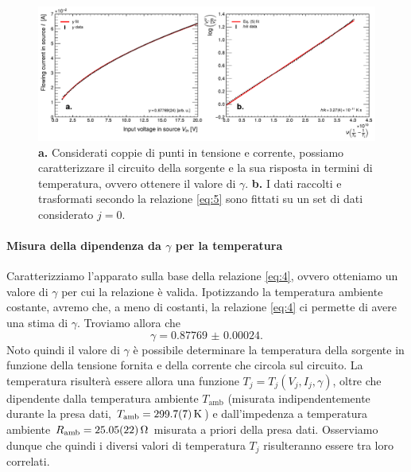 \documentclass[a4paper, varvw, nofootinbib]{revtex4-2}
\begin{document}
\begin{figure}
    \centering
    \includegraphics[width=14cm]{fig/plot_hk}
    \caption{\textbf{a.} Considerati coppie di punti in tensione e corrente, possiamo caratterizzare il circuito della sorgente e la sua risposta in termini di temperatura, ovvero ottenere il valore di $\gamma$. \textbf{b.} I dati raccolti e trasformati secondo la relazione \eqref{eq:5} sono fittati su un set di dati considerato $j=0$.}
\end{figure}

\paragraph*{Misura della dipendenza da $\gamma$ per la temperatura} Caratterizziamo l'apparato sulla base della relazione \eqref{eq:4}, ovvero otteniamo un valore di $\gamma$ per cui la relazione è valida. Ipotizzando la temperatura ambiente costante, avremo che, a meno di costanti, la relazione \eqref{eq:4} ci permette di avere una stima di $\gamma$. Troviamo allora che \[\gamma = \num{0.87769(24)}.\] Noto quindi il valore di $\gamma$ è possibile determinare la temperatura della sorgente in funzione della tensione fornita e della corrente che circola sul circuito. La temperatura risulterà essere allora una funzione $T_j = T_j(V_j, I_j, \gamma)$, oltre che dipendente dalla temperatura ambiente $T_\text{amb}$ (misurata indipendentemente durante la presa dati, $T_\text{amb} = \SI{299.7 +- 0.7}{\kelvin}$) e dall'impedenza a temperatura ambiente $R_\text{amb} = \SI{25.045 +- 0.215}{\ohm}$ misurata a priori della presa dati. Osserviamo dunque che quindi i diversi valori di temperatura $T_j$ risulteranno essere tra loro correlati. 
\end{document}
